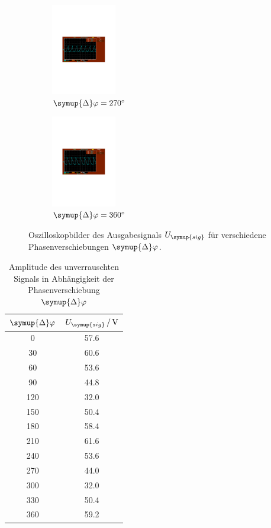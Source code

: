 \begin{figure}
  \begin{subfigure}{0.48\textwidth}
    \centering
    \includegraphics[height=4cm]{content/Bilder/unverrauscht/270.pdf}
    \caption{$\symup{\Delta}\varphi = \qty{270}{\degree}$}
  \end{subfigure}
  \begin{subfigure}{0.48\textwidth}
    \centering
    \includegraphics[height=4cm]{content/Bilder/unverrauscht/360.pdf}
    \caption{$\symup{\Delta}\varphi = \qty{360}{\degree}$}
  \end{subfigure}
  \caption{Oszilloskopbilder des Ausgabesignals $U_{\symup{sig}}$ für verschiedene Phasenverschiebungen $\symup{\Delta}\varphi$.}
  \label{fig:test}
\end{figure}

\begin{table} [H]
  \centering
  \caption{Amplitude des unverrauschten Signals in Abhängigkeit der Phasenverschiebung $\symup{\Delta}\varphi$}
  \label{tab:unverrauscht}
  \begin{tabular}{S[table-format=3.0] S[table-format=2.1]}
    \toprule
    {$\symup{\Delta}\varphi$} & {$U_{\symup{sig}}\,/\,\unit{\volt}$} \\
    	  & 57.6 \\
    30	& 60.6 \\
    60	& 53.6 \\
    90	& 44.8 \\
    120	& 32.0 \\
    150	& 50.4 \\
    180	& 58.4 \\
    210	& 61.6 \\
    240	& 53.6 \\
    270	& 44.0 \\
    300	& 32.0 \\
    330	& 50.4 \\
    360	& 59.2 \\
    \bottomrule
  \end{tabular}
\end{table}

